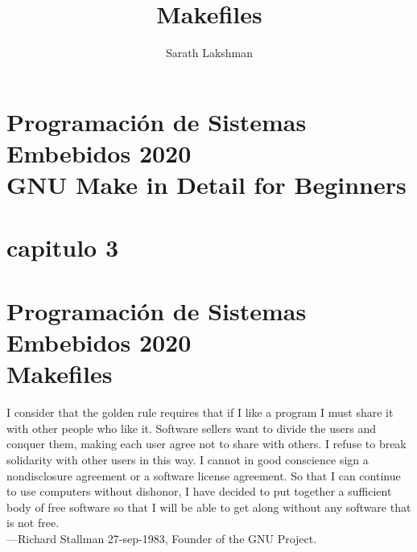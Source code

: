 \documentclass[output=paper, 
colorlinks,
citecolor=brown,
newtxmath
]{langscibook}
\author{Sarath Lakshman}
\title{Makefiles}
\begin{document}

\chapterfont{\Large\color{LightBlue}} 
\chapter*{Programación de Sistemas Embebidos 2020\\ GNU Make in Detail for Beginners}
{\def\addcontentsline#1#2#3{}\maketitle}
\chapter*{capitulo 3}
{\def\addcontentsline#1#2#3{}\maketitle}

\chapter*{Programación de Sistemas Embebidos 2020\\ Makefiles}

\begingroup
\let\clearpage\relax
\cleardoublepage
\hypersetup{linkcolor=blue}
\tableofcontents
\let\clearpage\relax
\cleardoublepage
\endgroup



{\def\addcontentsline#1#2#3{}\maketitle}


\setcounter{page}{1}


\hfill\begin{minipage}{0.8\linewidth} \footnotesize
I consider that the golden rule requires that if I like a program I 
must share it with other people who like it. 
Software sellers want to divide the users and conquer them, making 
each user agree not to share with others. I refuse to break solidarity 
with other users in this way. I cannot in good conscience sign a
nondisclosure agreement or a software license agreement. 
So that I can continue to use computers
without dishonor, I have decided to put together a sufficient body of free software so that I will be able
to get along without any software that is not free.\\
—Richard Stallman 27-sep-1983, Founder of the GNU Project.
\end{minipage}
\end{document}
